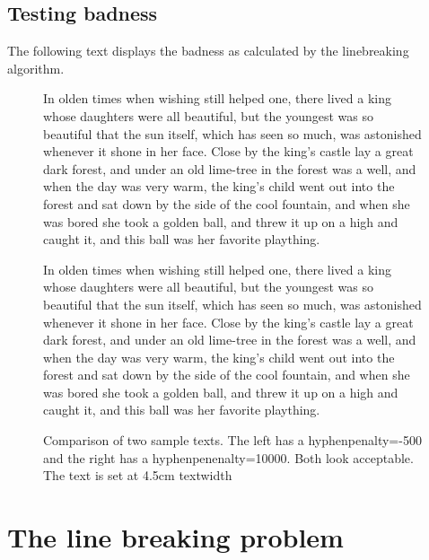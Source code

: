 {{\section{Testing badness}
The following text displays the badness as calculated by the linebreaking algorithm.
\begin{figure*}[htb]
\fussy
{} 
\begin{minipage}[t]{4.5cm}
\mbox{}
\trypar{}
In olden times when wishing
still helped one, there lived a
king whose daughters were all
beautiful, but the youngest was so
beautiful that the sun itself,
which has seen so much, was
astonished whenever it shone in
her face. Close by the king's
castle lay a great dark forest,
and under an old lime-tree in the
forest was a well, and when
the day was very warm, the
king's child went out into the 
forest and sat down by the side
of the cool fountain, and when she was bored she
took a golden ball, and threw it up on a high and caught it, and this
ball was her favorite plaything. \par
\end{minipage}
\hspace{2cm}
\begin{minipage}[t]{4.5cm}
\mbox{}
\trypar{}
In olden times when wishing
still helped one, there lived a
king whose daughters were all
beautiful, but the youngest was so
beautiful that the sun itself,
which has seen so much, was
astonished whenever it shone in
her face. Close by the king's
castle lay a great dark forest,
and under an old lime-tree in the
forest was a well, and when
the day was very warm, the
king's child went out into the 
forest and sat down by the side
of the cool fountain, and when she was bored she
took a golden ball, and threw it up on a high and caught it, and this
ball was her favorite plaything. \par
\end{minipage}
\caption{Comparison of two sample texts. The left has a hyphenpenalty=-500 and the right has a hyphenpenenalty=10000. Both look acceptable. The text is set at 4.5cm textwidth}
\end{figure*}

\lorem

\lorem

\lorem



\chapter{The line breaking problem}

}}
